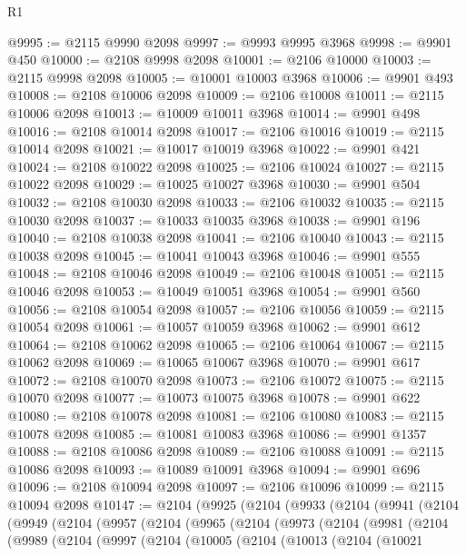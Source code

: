 \begin{lexlean}{R1}
\begin{coremodule}
@9995 := @2115 @9990 @2098
@9997 := @9993 @9995 @3968
@9998 := @9901 @450
@10000 := @2108 @9998 @2098
@10001 := @2106 @10000
@10003 := @2115 @9998 @2098
@10005 := @10001 @10003 @3968
@10006 := @9901 @493
@10008 := @2108 @10006 @2098
@10009 := @2106 @10008
@10011 := @2115 @10006 @2098
@10013 := @10009 @10011 @3968
@10014 := @9901 @498
@10016 := @2108 @10014 @2098
@10017 := @2106 @10016
@10019 := @2115 @10014 @2098
@10021 := @10017 @10019 @3968
@10022 := @9901 @421
@10024 := @2108 @10022 @2098
@10025 := @2106 @10024
@10027 := @2115 @10022 @2098
@10029 := @10025 @10027 @3968
@10030 := @9901 @504
@10032 := @2108 @10030 @2098
@10033 := @2106 @10032
@10035 := @2115 @10030 @2098
@10037 := @10033 @10035 @3968
@10038 := @9901 @196
@10040 := @2108 @10038 @2098
@10041 := @2106 @10040
@10043 := @2115 @10038 @2098
@10045 := @10041 @10043 @3968
@10046 := @9901 @555
@10048 := @2108 @10046 @2098
@10049 := @2106 @10048
@10051 := @2115 @10046 @2098
@10053 := @10049 @10051 @3968
@10054 := @9901 @560
@10056 := @2108 @10054 @2098
@10057 := @2106 @10056
@10059 := @2115 @10054 @2098
@10061 := @10057 @10059 @3968
@10062 := @9901 @612
@10064 := @2108 @10062 @2098
@10065 := @2106 @10064
@10067 := @2115 @10062 @2098
@10069 := @10065 @10067 @3968
@10070 := @9901 @617
@10072 := @2108 @10070 @2098
@10073 := @2106 @10072
@10075 := @2115 @10070 @2098
@10077 := @10073 @10075 @3968
@10078 := @9901 @622
@10080 := @2108 @10078 @2098
@10081 := @2106 @10080
@10083 := @2115 @10078 @2098
@10085 := @10081 @10083 @3968
@10086 := @9901 @1357
@10088 := @2108 @10086 @2098
@10089 := @2106 @10088
@10091 := @2115 @10086 @2098
@10093 := @10089 @10091 @3968
@10094 := @9901 @696
@10096 := @2108 @10094 @2098
@10097 := @2106 @10096
@10099 := @2115 @10094 @2098
@10147 := @2104
    (@9925
      (@2104
        (@9933
          (@2104
            (@9941
              (@2104
                (@9949
                  (@2104
                    (@9957
                      (@2104
                        (@9965
                          (@2104
                            (@9973
                              (@2104
                                (@9981
                                  (@2104
                                    (@9989
                                      (@2104
                                        (@9997
                                          (@2104
                                            (@10005
                                              (@2104
                                                (@10013
                                                  (@2104
                                                    (@10021

\end{coremodule}
\end{lexlean}
